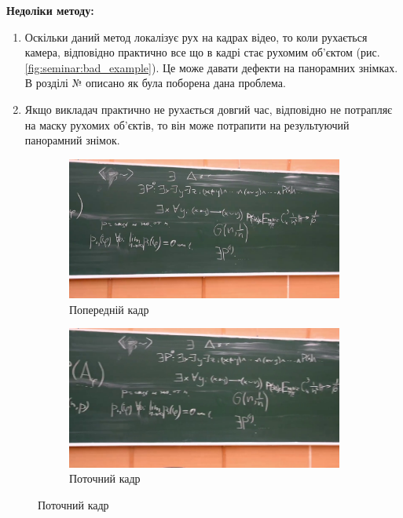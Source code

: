 \textbf{Недоліки методу:}
\begin{enumerate}
    \item Оскільки даний метод локалізує рух на кадрах відео, то коли 
    рухається камера, відповідно практично все що в кадрі стає рухомим об'єктом (рис. 
    \ref{fig:seminar:bad_example}). Це може давати дефекти на панорамних знімках. В 
    розділі № описано як була поборена дана проблема.
    \item Якщо викладач практично не рухається довгий час, відповідно не потрапляє
    на маску рухомих об'єктів, то він може потрапити на 
    результуючий панорамний знімок.
\end{enumerate}

\begin{figure}[h]
    \centering
    \begin{subfigure}[c]{0.4\textwidth}
        \centering
        \includegraphics[width=\textwidth]{images/bad_example_1}
        \caption{Попередній кадр
        \label{fig:seminar:bad_example:a}
        }
    \end{subfigure}
    \begin{subfigure}[c]{0.4\textwidth}
        \centering
        \includegraphics[width=\textwidth]{images/bad_example_2}
        \caption{Поточний кадр
        \label{fig:seminar:bad_example:b}
        }
    \end{subfigure}
\end{figure}
